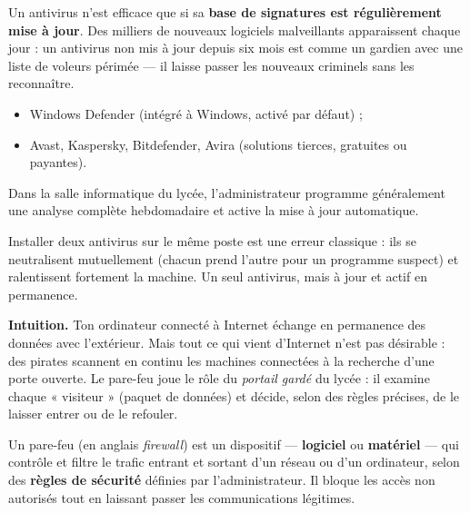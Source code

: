 \documentclass[11pt]{article}
\newcommand{\cle}[1]{{\popxbold\color{popdark}#1}}
\newcounter{popsec}
\newcounter{popsub}
\newcommand{\courssub}[1]{%
  \stepcounter{popsub}%
  \par\vspace{9pt}\noindent{\popxbold\fontsize{11.5}{13}\selectfont\color{popink}{\color{poporange}\thepopsec.\thepopsub}\hspace{6pt}#1}\par\nopagebreak\vspace{4pt}
}
\begin{document}
\begin{propriete}
Un antivirus n'est efficace que si sa \textbf{base de signatures est régulièrement mise à jour}. Des milliers de nouveaux logiciels malveillants apparaissent chaque jour : un antivirus non mis à jour depuis six mois est comme un gardien avec une liste de voleurs périmée — il laisse passer les nouveaux criminels sans les reconnaître.
\end{propriete}

\begin{exemplebox}
\begin{itemize}
\item Windows Defender (intégré à Windows, activé par défaut) ;
\item Avast, Kaspersky, Bitdefender, Avira (solutions tierces, gratuites ou payantes).
\end{itemize}
Dans la salle informatique du lycée, l'administrateur programme généralement une analyse complète hebdomadaire et active la mise à jour automatique.
\end{exemplebox}

\begin{attention}
Installer deux antivirus sur le même poste est une erreur classique : ils se neutralisent mutuellement (chacun prend l'autre pour un programme suspect) et ralentissent fortement la machine. Un seul antivirus, mais à jour et actif en permanence.
\end{attention}

\courssub{Le pare-feu : la muraille filtrante}

\textbf{Intuition.} Ton ordinateur connecté à Internet échange en permanence des données avec l'extérieur. Mais tout ce qui vient d'Internet n'est pas désirable : des pirates scannent en continu les machines connectées à la recherche d'une porte ouverte. Le pare-feu joue le rôle du \emph{portail gardé} du lycée : il examine chaque « visiteur » (paquet de données) et décide, selon des règles précises, de le laisser entrer ou de le refouler.

\begin{definition}
Un \cle{pare-feu} (en anglais \emph{firewall}) est un dispositif — \textbf{logiciel} ou \textbf{matériel} — qui contrôle et filtre le trafic entrant et sortant d'un réseau ou d'un ordinateur, selon des \textbf{règles de sécurité} définies par l'administrateur. Il bloque les accès non autorisés tout en laissant passer les communications légitimes.
\end{definition}
\end{document}
